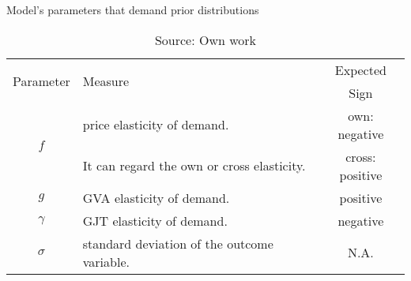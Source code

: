 
\begin{table}[!ht] \centering 
  \caption{Model's parameters that demand prior distributions} 
  \label{tbl:param_priors} 
{\renewcommand\arraystretch{1.25}}
\begin{tabular} {clc}
\toprule
\multirow{2}{*}{Parameter}  & \multirow{2}{*}{Measure}  & Expected \\
                            &                           & Sign \\
\hline
\multirow{2}{*}{$f$}        & price elasticity of demand.& own: negative \\
		   & It can regard the own or cross elasticity.  & cross: positive\\
$g$        & GVA elasticity of demand. & positive \\ 
$\gamma$   & GJT elasticity of demand. & negative\\
$\sigma$   & standard deviation of the outcome variable.& N.A.\\
\bottomrule
\end{tabular}%
\caption*{Source: Own work}
\end{table} 

